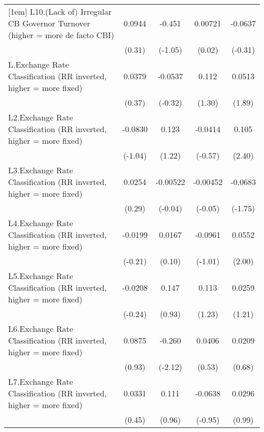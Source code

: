 {\begin{longtable}{l*{4}{c}}
[1em]
L10.(Lack of) Irregular CB Governor Turnover (higher = more de facto CBI)&   0.0944         &   -0.451         &  0.00721         &  -0.0637         \\
                &   (0.31)         &  (-1.05)         &   (0.02)         &  (-0.31)         \\
[1em]
L.Exchange Rate Classification (RR inverted, higher = more fixed)&   0.0379         &  -0.0537         &    0.112         &   0.0513         \\
                &   (0.37)         &  (-0.32)         &   (1.30)         &   (1.89)         \\
[1em]
L2.Exchange Rate Classification (RR inverted, higher = more fixed)&  -0.0830         &    0.123         &  -0.0414         &    0.105\sym{*}  \\
                &  (-1.04)         &   (1.22)         &  (-0.57)         &   (2.40)         \\
[1em]
L3.Exchange Rate Classification (RR inverted, higher = more fixed)&   0.0254         & -0.00522         & -0.00452         &  -0.0683         \\
                &   (0.29)         &  (-0.04)         &  (-0.05)         &  (-1.75)         \\
[1em]
L4.Exchange Rate Classification (RR inverted, higher = more fixed)&  -0.0199         &   0.0167         &  -0.0961         &   0.0552\sym{*}  \\
                &  (-0.21)         &   (0.10)         &  (-1.01)         &   (2.00)         \\
[1em]
L5.Exchange Rate Classification (RR inverted, higher = more fixed)&  -0.0208         &    0.147         &    0.113         &   0.0259         \\
                &  (-0.24)         &   (0.93)         &   (1.23)         &   (1.21)         \\
[1em]
L6.Exchange Rate Classification (RR inverted, higher = more fixed)&   0.0875         &   -0.260\sym{*}  &   0.0406         &   0.0209         \\
                &   (0.93)         &  (-2.12)         &   (0.53)         &   (0.68)         \\
[1em]
L7.Exchange Rate Classification (RR inverted, higher = more fixed)&   0.0331         &    0.111         &  -0.0638         &   0.0296         \\
                &   (0.45)         &   (0.96)         &  (-0.95)         &   (0.99)         \\

\end{longtable}}
